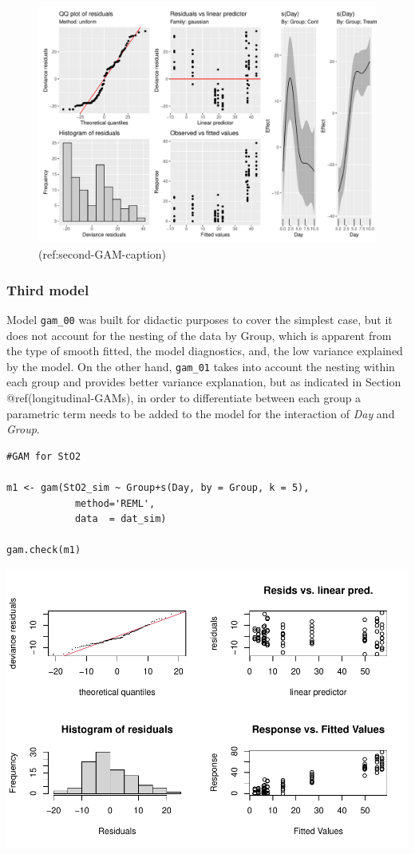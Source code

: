 \documentclass[Royal,times,sagev]{sagej}
\begin{document}
\begin{figure}

{\centering \includegraphics[width=0.75\linewidth]{Full_document_SAGE_files/figure-latex/second-GAM-diag-1} 

}

\caption{(ref:second-GAM-caption)}\label{fig:second-GAM-diag}
\end{figure}

\hypertarget{third-model}{%
\subsubsection{Third model}\label{third-model}}

Model \texttt{gam\_00} was built for didactic purposes to cover the
simplest case, but it does not account for the nesting of the data by
Group, which is apparent from the type of smooth fitted, the model
diagnostics, and, the low variance explained by the model. On the other
hand, \texttt{gam\_01} takes into account the nesting within each group
and provides better variance explanation, but as indicated in Section
@ref(longitudinal-GAMs), in order to differentiate between each group a
parametric term needs to be added to the model for the interaction of
\emph{Day} and \emph{Group}.

\begin{verbatim}
#GAM for StO2

m1 <- gam(StO2_sim ~ Group+s(Day, by = Group, k = 5),
            method='REML',
            data  = dat_sim)

gam.check(m1)
\end{verbatim}

\includegraphics{Full_document_SAGE_files/figure-latex/final-model-Appendix-1.pdf}
\end{document}
